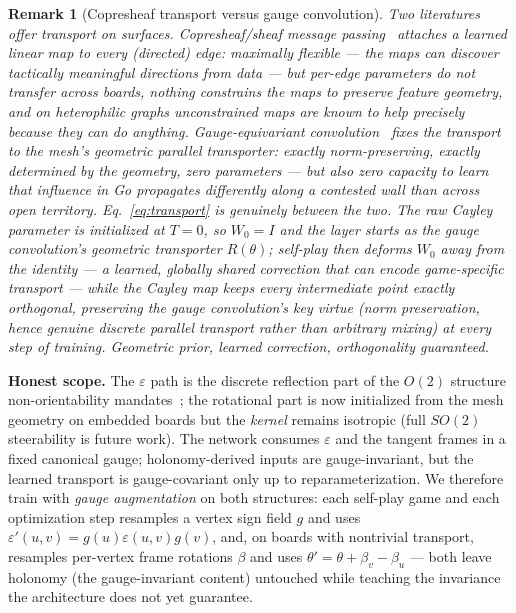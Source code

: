 \documentclass[11pt]{article}
\newtheorem{remark}{Remark}
\newcommand{\eps}{\varepsilon}
\begin{document}
\begin{remark}[Copresheaf transport versus gauge convolution]
\label{rem:copresheaf}
Two literatures offer transport on surfaces. \emph{Copresheaf/sheaf
message passing}~\cite{bodnar2022sheaf} attaches a learned linear map to
every (directed) edge: maximally flexible --- the maps can discover
tactically meaningful directions from data --- but per-edge parameters do
not transfer across boards, nothing constrains the maps to preserve
feature geometry, and on heterophilic graphs unconstrained maps are known
to help precisely because they can do \emph{anything}. \emph{Gauge-equivariant
convolution}~\cite{cohen2019gauge,dehaan2021gem,weiler2021coordinate}
fixes the transport to the mesh's geometric parallel transporter: exactly
norm-preserving, exactly determined by the geometry, zero parameters ---
but also zero capacity to learn that influence in Go propagates
differently along a contested wall than across open territory.
Eq.~\ref{eq:transport} is genuinely between the two. The raw Cayley
parameter is initialized at $T=0$, so $W_0 = I$ and the layer \emph{starts
as the gauge convolution's geometric transporter} $R(\theta)$; self-play
then deforms $W_0$ away from the identity --- a learned, globally shared
correction that can encode game-specific transport --- while the Cayley
map keeps every intermediate point exactly orthogonal, preserving the
gauge convolution's key virtue (norm preservation, hence genuine discrete
parallel transport rather than arbitrary mixing) at every step of
training. Geometric prior, learned correction, orthogonality guaranteed.
\end{remark}

\textbf{Honest scope.} The $\eps$ path is the discrete reflection part of
the $O(2)$ structure non-orientability
mandates~\cite{weiler2021coordinate}; the rotational part is now
initialized from the mesh geometry on embedded boards but the
\emph{kernel} remains isotropic (full $SO(2)$ steerability is future
work). The network consumes $\eps$ and the tangent frames in a fixed
canonical gauge; holonomy-derived inputs are gauge-invariant, but the
learned transport is gauge-covariant only up to reparameterization. We
therefore train with \emph{gauge augmentation} on both structures: each
self-play game and each optimization step resamples a vertex sign field
$g$ and uses $\eps'(u,v)=g(u)\eps(u,v)g(v)$, and, on boards with
nontrivial transport, resamples per-vertex frame rotations $\beta$ and
uses $\theta' = \theta + \beta_v - \beta_u$ --- both leave holonomy (the
gauge-invariant content) untouched while teaching the invariance the
architecture does not yet guarantee.
\end{document}
